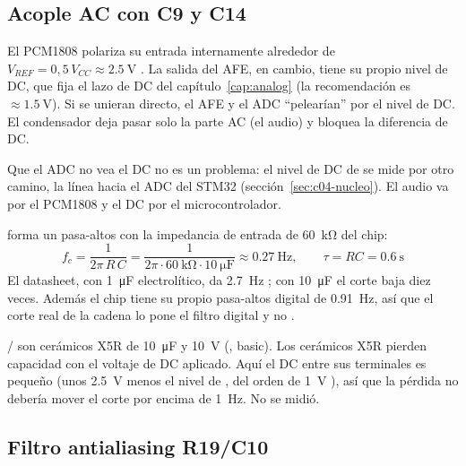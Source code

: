 \subsection{Acople AC con C9 y C14}

El PCM1808 polariza su entrada internamente alrededor de $V_{REF}=0{,}5\,V_{CC}\approx\SI{2.5}{\volt}$ . La salida del AFE, en cambio, tiene su propio nivel de DC, que fija el lazo de DC del capítulo~\ref{cap:analog} (la recomendación es $\approx\SI{1.5}{\volt}$). Si se unieran directo, el AFE y el ADC ``pelearían'' por el nivel de DC. El condensador  deja pasar solo la parte AC (el audio) y bloquea la diferencia de DC.

\begin{idea}[el DC no se pierde]
Que el ADC no vea el DC no es un problema: el nivel de DC de  se mide por otro camino, la línea  hacia el ADC del STM32 (sección~\ref{sec:c04-nucleo}). El audio va por el PCM1808 y el DC por el microcontrolador.
\end{idea}

\begin{calculo}
 forma un pasa-altos con la impedancia de entrada de \SI{60}{\kilo\ohm} del chip:
\[
f_c = \frac{1}{2\pi\,R\,C}=\frac{1}{2\pi\cdot\SI{60}{\kilo\ohm}\cdot\SI{10}{\micro\farad}}\approx\SI{0.27}{\hertz},
\qquad \tau = RC = \SI{0.6}{\second}
\]
El datasheet, con \SI{1}{\micro\farad} electrolítico, da \SI{2.7}{\hertz} ; con \SI{10}{\micro\farad} el corte baja diez veces. Además el chip tiene su propio pasa-altos digital de \SI{0.91}{\hertz}, así que el corte real de la cadena lo pone el filtro digital y no .
\end{calculo}

\begin{ojo}
/ son cerámicos X5R de \SI{10}{\micro\farad} y \SI{10}{\volt} (, basic). Los cerámicos X5R pierden capacidad con el voltaje de DC aplicado. Aquí el DC entre sus terminales es pequeño (unos \SI{2.5}{\volt} menos el nivel de , del orden de \SI{1}{\volt} \estimado), así que la pérdida no debería mover el corte por encima de \SI{1}{\hertz}. No se midió.
\end{ojo}

\subsection{Filtro antialiasing R19/C10}


